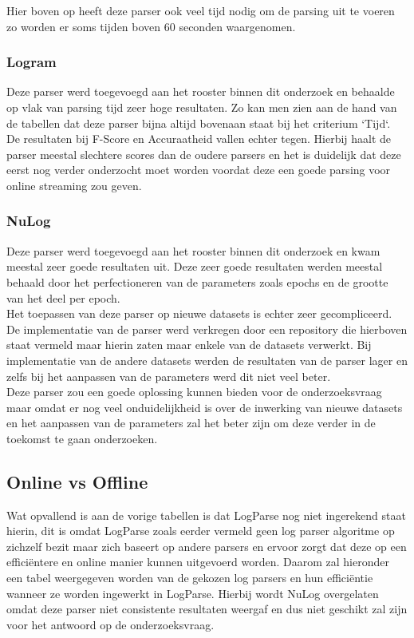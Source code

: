 Hier boven op heeft deze parser ook veel tijd nodig om de parsing uit te voeren zo worden er soms tijden boven 60 seconden waargenomen.

\subsubsection{Logram}
Deze parser werd toegevoegd aan het rooster binnen dit onderzoek en behaalde op vlak van parsing tijd zeer hoge resultaten. Zo kan men zien aan de hand van de tabellen dat deze parser bijna altijd bovenaan staat bij het criterium `Tijd`.\\

De resultaten bij F-Score en Accuraatheid vallen echter tegen. Hierbij haalt de parser meestal slechtere scores dan de oudere parsers en het is duidelijk dat deze eerst nog verder onderzocht moet worden voordat deze een goede parsing voor online streaming zou geven.

\subsubsection{NuLog}
Deze parser werd toegevoegd aan het rooster binnen dit onderzoek en kwam meestal zeer goede resultaten uit. Deze zeer goede resultaten werden meestal behaald door het perfectioneren van de parameters zoals epochs en de grootte van het deel per epoch.\\

Het toepassen van deze parser op nieuwe datasets is echter zeer gecompliceerd. De implementatie van de parser werd verkregen door een repository die hierboven staat vermeld maar hierin zaten maar enkele van de datasets verwerkt. Bij implementatie van de andere datasets werden de resultaten van de parser lager en zelfs bij het aanpassen van de parameters werd dit niet veel beter.\\

Deze parser zou een goede oplossing kunnen bieden voor de onderzoeksvraag maar omdat er nog veel onduidelijkheid is over de inwerking van nieuwe datasets en het aanpassen van de parameters zal het beter zijn om deze verder in de toekomst te gaan onderzoeken.

\subsection{Online vs Offline}
\label{subsection:OnlineOffline}
Wat opvallend is aan de vorige tabellen is dat LogParse nog niet ingerekend staat hierin, dit is omdat LogParse zoals eerder vermeld geen log parser algoritme op zichzelf bezit maar zich baseert op andere parsers en ervoor zorgt dat deze op een efficiëntere en online manier kunnen uitgevoerd worden. Daarom zal hieronder een tabel weergegeven worden van de gekozen log parsers en hun efficiëntie wanneer ze worden ingewerkt in LogParse. Hierbij wordt NuLog overgelaten omdat deze parser niet consistente resultaten weergaf en dus niet geschikt zal zijn voor het antwoord op de onderzoeksvraag.\\

